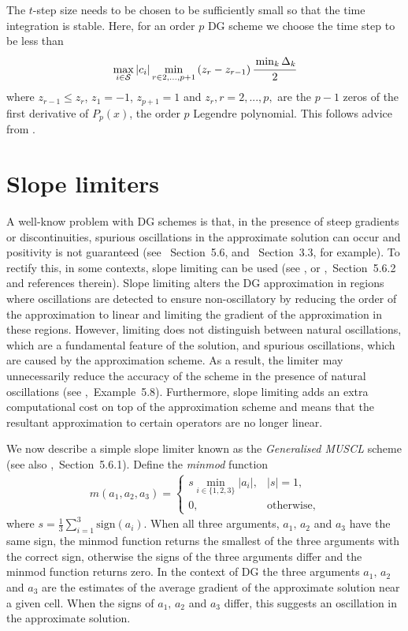 The \(t\)-step size needs to be chosen to be sufficiently small so that the time integration is stable. Here, for an order \(p\) DG scheme we choose the time step to be less than 
\[\max_{i\in\mathcal{S}}|c_i|\min_{r\in{2,...,p+1}}\left(z_{r}-z_{r-1}\right) \cfrac{\min_{k}{\Delta}_k}{2}\]
where \(z_{r-1}\leq z_r\), \(z_1=-1\), \(z_{p+1}=1\) and \(z_r, r=2,...,p,\) are the \(p-1\) zeros of the first derivative of \(P_{p}(x)\), the order \(p\) Legendre polynomial. This follows advice from \cite{nodalDGBook}. 

\section{Slope limiters}\label{sec: slope limiting}
A well-know problem with DG schemes is that, in the presence of steep gradients or discontinuities, spurious oscillations in the approximate solution can occur and positivity is not guaranteed (see \cite{nodalDGBook}~Section~5.6, and \cite{koltai2011}~Section~3.3, for example). To rectify this, in some contexts, slope limiting can be used (see \cite{c99}, or \cite{nodalDGBook},~Section~5.6.2 and references therein). Slope limiting alters the DG approximation in regions where oscillations are detected to ensure non-oscillatory by reducing the order of the approximation to linear and limiting the gradient of the approximation in these regions. However, limiting does not distinguish between natural oscillations, which are a fundamental feature of the solution, and spurious oscillations, which are caused by the approximation scheme. As a result, the limiter may unnecessarily reduce the accuracy of the scheme in the presence of natural oscillations (see \citep{nodalDGBook},~Example~5.8). Furthermore, slope limiting adds an extra computational cost on top of the approximation scheme and means that the resultant approximation to certain operators are no longer linear.

We now describe a simple slope limiter known as the \emph{Generalised MUSCL} scheme \citep{c99} (see also \citep{nodalDGBook},~Section~5.6.1). Define the \emph{minmod} function 
\begin{align*}
	m(a_1,a_2,a_3)=\begin{cases}
		s\min_{i\in\{1,2,3\}}|a_i|, & |s|=1, \\
		0, &\mbox{otherwise},
	\end{cases}
\end{align*}
where \(s=\frac{1}{3}\sum\limits_{i=1}^{3}\mbox{sign}(a_i)\). When all three arguments, \(a_1,\,a_2\) and \(a_3\) have the same sign, the minmod function returns the smallest of the three arguments with the correct sign, otherwise the signs of the three arguments differ and the minmod function returns zero. In the context of DG the three arguments \(a_1,\,a_2\) and \(a_3\) are the estimates of the average gradient of the approximate solution near a given cell. When the signs of \(a_1,\,a_2\) and \(a_3\) differ, this suggests an oscillation in the approximate solution. 

